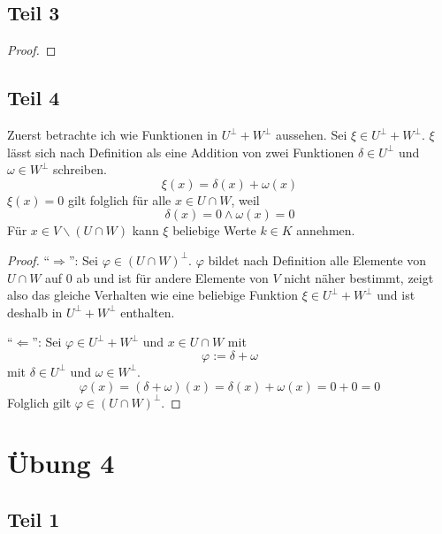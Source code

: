 \documentclass[a4paper,10pt]{article}
\begin{document}
\subsection*{Teil 3}

\begin{proof}

\end{proof}

\subsection*{Teil 4}

Zuerst betrachte ich wie Funktionen in $U^\perp + W^\perp$ aussehen.
Sei $\xi \in U^\perp + W^\perp$.
$\xi$ lässt sich nach Definition als eine Addition von zwei Funktionen $\delta \in U^\perp$ und $\omega \in W^\perp$ schreiben.
\begin{equation}
 \xi(x) = \delta(x) + \omega(x)
\end{equation}
$\xi(x) = 0$ gilt folglich für alle $x \in U \cap W$, weil
\begin{equation}
 \delta(x) = 0 \land \omega(x) = 0
\end{equation}
Für $x \in V \backslash (U \cap W)$ kann $\xi$ beliebige Werte $k \in K$ annehmen.

\begin{proof}
 ``$\Rightarrow$'': Sei $\varphi \in (U \cap W)^\perp$.
 $\varphi$ bildet nach Definition alle Elemente von $U \cap W$ auf $0$ ab und ist für andere Elemente von $V$ nicht näher bestimmt, zeigt also das gleiche Verhalten wie eine beliebige Funktion $\xi \in U^\perp + W^\perp$ und ist deshalb in $U^\perp + W^\perp$ enthalten.
 
 ``$\Leftarrow$'': Sei $\varphi \in U^\perp + W^\perp$ und $x \in U \cap W$ mit
 \begin{equation}
  \varphi := \delta + \omega
 \end{equation}
 mit $\delta \in U^\perp$ und $\omega \in W^\perp$.
 \begin{equation}
  \varphi(x) = (\delta + \omega)(x) = \delta(x) + \omega(x) = 0 + 0 = 0
 \end{equation}
 Folglich gilt $\varphi \in (U \cap W)^\perp$.
\end{proof}

\section*{Übung 4}

\subsection*{Teil 1}
\end{document}
